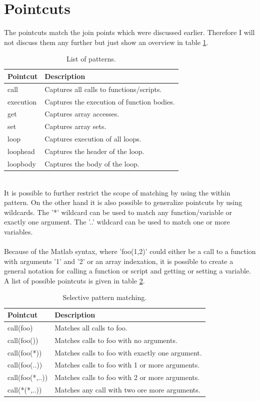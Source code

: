 \documentclass[a4paper]{report}
\begin{document}
\section{Pointcuts}
The pointcuts match the join points which were discussed earlier. Therefore I will not discuss them any further but just show an overview in table \ref{tab:Matlab_Patterns}.\\
\begin{table}[h!]
\centering
\begin{tabular}{l|l}
\hline
Pointcut & Description\\
\hline
\hline
call & Captures all calls to functions/scripts.\\
execution & Captures the execution of function bodies.\\
get & Captures array accesses.\\
set & Captures array sets.\\
loop & Captures execution of all loops.\\
loophead & Captures the header of the loop.\\
loopbody & Captures the body of the loop.\\
\hline
\end{tabular}
\caption{List of patterns.}
\label{tab:Matlab_Patterns}
\end{table}\\
It is possible to further restrict the scope of matching by using the within pattern. On the other hand it is also possible to generalize pointcuts by using wildcards. The '*' wildcard can be used to match any function/variable or exactly one argument. The '..' wildcard can be used to match one or more variables.\\
\\
Because of the Matlab syntax, where 'foo(1,2)' could either be a call to a function with arguments '1' and '2' or an array indexation, it is possible to create a general notation for calling a function or script and getting or setting a variable. A list of possible pointcuts is given in table \ref{tab:Matlab_PatternExamples}.\\
\begin{table}[h!]
\centering
\begin{tabular}{l|l}
\hline
Pointcut & Description\\
\hline
\hline
call(foo) & Matches all calls to foo.\\
call(foo()) & Matches calls to foo with no arguments.\\
call(foo(*)) & Matches calls to foo with exactly one argument.\\
call(foo(..)) & Matches calls to foo with 1 or more arguments.\\
call(foo(*,..)) & Matches calls to foo with 2 or more arguments.\\
call(*(*,..)) & Matches any call with two ore more arguments.\\
\hline
\end{tabular}
\caption{Selective pattern matching.}
\label{tab:Matlab_PatternExamples}
\end{table}\\
\end{document}
